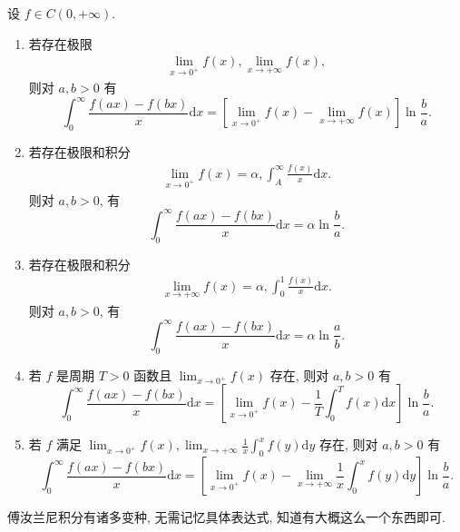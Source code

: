 \documentclass[../../main.tex]{subfiles}%
\begin{document}
\begin{theorem}\label{theorem:Frullani(傅汝兰尼)积分}
设 $f \in C(0,+\infty)$.
\begin{enumerate}
\item 若存在极限
\begin{align}
\lim_{x \to 0^+} f(x), \lim_{x \to +\infty} f(x), \label{equation:::::::-----2864611---14.3}
\end{align}
则对 $a,b > 0$ 有
$$\int_0^\infty \frac{f(ax) - f(bx)}{x} \mathrm{d}x = \left[ \lim_{x \to 0^+} f(x) - \lim_{x \to +\infty} f(x) \right] \ln \frac{b}{a}.$$

\item 若存在极限和积分
\begin{align}
\lim_{x \to 0^+} f(x) = \alpha, \int_A^\infty \frac{f(x)}{x} \mathrm{d}x. \label{equation:::::::-----2864611---14.4}
\end{align}
则对 $a,b > 0$, 有
$$\int_0^\infty \frac{f(ax) - f(bx)}{x} \mathrm{d}x = \alpha \ln \frac{b}{a}.$$

\item 若存在极限和积分
\begin{align}
\lim_{x \to +\infty} f(x) = \alpha, \int_0^1 \frac{f(x)}{x} \mathrm{d}x. \label{equation:::::::-----2864611---14.5}
\end{align}
则对 $a,b > 0$, 有
$$\int_0^\infty \frac{f(ax) - f(bx)}{x} \mathrm{d}x = \alpha \ln \frac{a}{b}.$$

\item 若 $f$ 是周期 $T > 0$ 函数且 $\lim_{x \to 0^+} f(x)$ 存在, 则对 $a,b > 0$ 有
$$\int_0^\infty \frac{f(ax) - f(bx)}{x} \mathrm{d}x = \left[ \lim_{x \to 0^+} f(x) - \frac{1}{T} \int_0^T f(x) \mathrm{d}x \right] \ln \frac{b}{a}.$$

\item 若 $f$ 满足 $\lim_{x \to 0^+} f(x), \lim_{x \to +\infty} \frac{1}{x} \int_0^x f(y) \mathrm{d}y$ 存在, 则对 $a,b > 0$ 有
$$\int_0^\infty \frac{f(ax) - f(bx)}{x} \mathrm{d}x = \left[ \lim_{x \to 0^+} f(x) - \lim_{x \to +\infty} \frac{1}{x} \int_0^x f(y) \mathrm{d}y \right] \ln \frac{b}{a}.$$
\end{enumerate}
\end{theorem}
\begin{note}
傅汝兰尼积分有诸多变种, 无需记忆具体表达式, 知道有大概这么一个东西即可.
\end{note}
\end{document}
